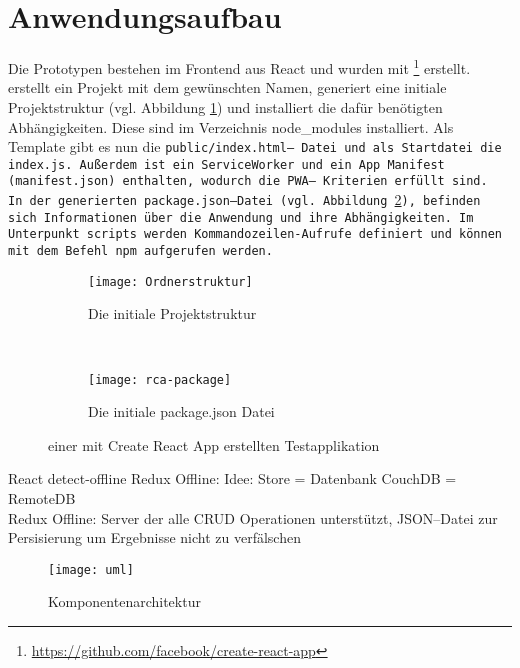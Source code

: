 \section{Anwendungsaufbau}
Die Prototypen bestehen im Frontend aus React und wurden mit \footnote{\url{https://github.com/facebook/create-react-app}} erstellt.  erstellt ein Projekt mit dem gewünschten Namen, generiert eine initiale Projektstruktur (vgl. Abbildung \ref{fig:init}) und installiert die dafür benötigten Abhängigkeiten. Diese sind im Verzeichnis node\_modules installiert.
Als Template gibt es nun die \tt{public/index.html}-- Datei und als Startdatei die \tt{index.js}. 
Außerdem ist ein ServiceWorker und ein App Manifest (\tt{manifest.json}) enthalten, wodurch die \gls{PWA}-- Kriterien erfüllt sind.\\
In der generierten \tt{package.json}--Datei (vgl. Abbildung \ref{fig:init2}), befinden sich Informationen über die Anwendung und ihre Abhängigkeiten. Im Unterpunkt \tt{scripts} werden Kommandozeilen-Aufrufe definiert und können mit dem Befehl \tt{npm} aufgerufen werden.
\begin{figure}[H]
  \centering
  \begin{subfigure}[t]{0.45\textwidth}
          \texttt{[image: Ordnerstruktur]}
          \caption{Die initiale Projektstruktur}
          \label{fig:init}
  \end{subfigure}
  ~ 
  \begin{subfigure}[t]{0.45\textwidth}
          \texttt{[image: rca-package]}
          \caption{Die initiale package.json Datei}
          \label{fig:init2}
  \end{subfigure}
  \grayRule
  \caption[Create React App: initiale Testapplikation]{einer mit Create React App erstellten Testapplikation}
  \label{fig:create-react-app}
\end{figure}

React detect-offline
Redux Offline: Idee: Store = Datenbank
CouchDB = RemoteDB\\
Redux Offline: Server der alle \gls{CRUD} Operationen unterstützt,
\gls{JSON}--Datei zur Persisierung um Ergebnisse nicht zu verfälschen 

%
%
%
\begin{figure}[H]
  \texttt{[image: uml]}
  \grayRule
  \caption{Komponentenarchitektur}
  \label{fig:uml}
\end{figure}

